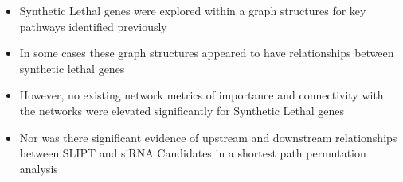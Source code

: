   \begin{itemize}
   \item Synthetic Lethal genes were explored within a graph structures for key pathways identified previously 
   
   \bigskip
   
   \item In some cases these graph structures appeared to have relationships between synthetic lethal genes  
   
   \bigskip
   
   \item However, no existing network metrics of importance and connectivity with the networks were elevated significantly for Synthetic Lethal genes
   
   \bigskip
   
   \item Nor was there significant evidence of upstream and downstream relationships between SLIPT and siRNA Candidates in a shortest path permutation analysis
  \end{itemize}
  
\clearpage